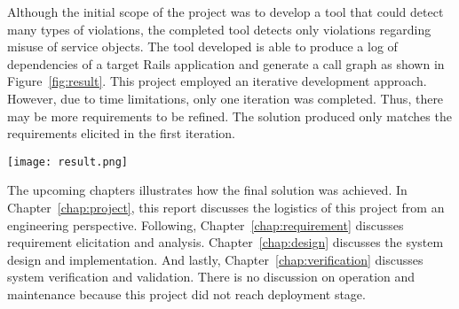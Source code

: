 Although the initial scope of the project was to develop a tool that could detect many types of violations, the completed tool detects only violations regarding misuse of service objects. The tool developed is able to produce a log of dependencies of a target Rails application and generate a call graph as shown in Figure~\ref{fig:result}. This project employed an iterative development approach. However, due to time limitations, only one iteration was completed. Thus, there may be more requirements to be refined. The solution produced only matches the requirements elicited in the first iteration.
\begin{center}
  \texttt{[image: result.png]}
    \label{fig:result}
\end{center}

The upcoming chapters illustrates how the final solution was achieved. In Chapter~\ref{chap:project}, this report discusses the logistics of this project from an engineering perspective. Following, Chapter~\ref{chap:requirement} discusses requirement elicitation and analysis. Chapter~\ref{chap:design} discusses the system design and implementation. And lastly, Chapter~\ref{chap:verification} discusses system verification and validation. There is no discussion on operation and maintenance because this project did not reach deployment stage.
